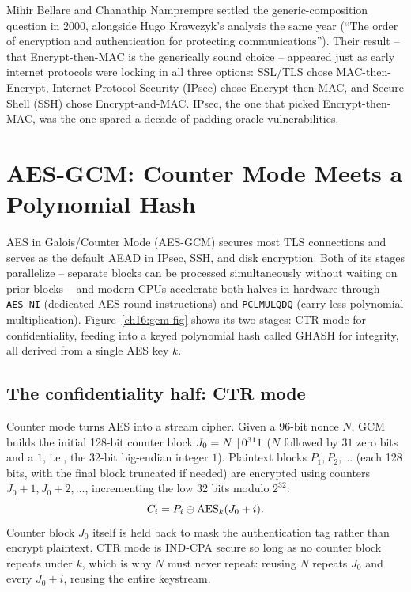 Mihir Bellare and Chanathip Namprempre settled the generic-composition question in 2000, alongside Hugo Krawczyk's analysis the same year (``The order of encryption and authentication for protecting communications''). Their result -- that Encrypt-then-MAC is the generically sound choice -- appeared just as early internet protocols were locking in all three options: SSL/TLS chose MAC-then-Encrypt, Internet Protocol Security (IPsec) chose Encrypt-then-MAC, and Secure Shell (SSH) chose Encrypt-and-MAC. IPsec, the one that picked Encrypt-then-MAC, was the one spared a decade of padding-oracle vulnerabilities.

\section{AES-GCM: Counter Mode Meets a Polynomial Hash}
\label{ch16:gcm}

AES in Galois/Counter Mode (AES-GCM) secures most TLS connections and serves as the default AEAD in IPsec, SSH, and disk encryption. Both of its stages parallelize -- separate blocks can be processed simultaneously without waiting on prior blocks -- and modern CPUs accelerate both halves in hardware through \texttt{AES-NI} (dedicated AES round instructions) and \texttt{PCLMULQDQ} (carry-less polynomial multiplication). Figure~\ref{ch16:gcm-fig} shows its two stages: CTR mode for confidentiality, feeding into a keyed polynomial hash called GHASH for integrity, all derived from a single AES key $k$.

\subsection{The confidentiality half: CTR mode}
\label{ch16:gcm-ctr}

Counter mode turns AES into a stream cipher. Given a 96-bit nonce $N$, GCM builds the initial 128-bit counter block $J_0 = N \,\|\, 0^{31}1$ ($N$ followed by $31$ zero bits and a $1$, i.e., the 32-bit big-endian integer $1$). Plaintext blocks $P_1, P_2, \dots$ (each 128 bits, with the final block truncated if needed) are encrypted using counters $J_0 + 1, J_0 + 2, \dots$, incrementing the low 32 bits modulo $2^{32}$:
\[
C_i = P_i \oplus \operatorname{AES}_k(J_0 + i).
\]
Counter block $J_0$ itself is held back to mask the authentication tag rather than encrypt plaintext. CTR mode is IND-CPA secure so long as no counter block repeats under $k$, which is why $N$ must never repeat: reusing $N$ repeats $J_0$ and every $J_0 + i$, reusing the entire keystream.

